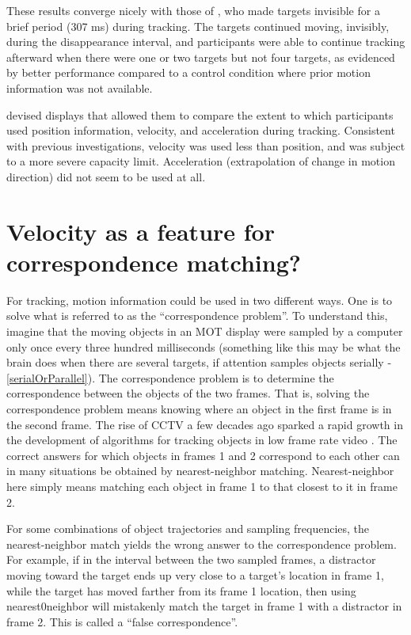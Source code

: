 \documentclass[
]{book}
\begin{document}
These results converge nicely with those of \citet{fencsikRoleLocationMotion2007}, who made targets invisible for a brief period (307 ms) during tracking. The targets continued moving, invisibly, during the disappearance interval, and participants were able to continue tracking afterward when there were one or two targets but not four targets, as evidenced by better performance compared to a control condition where prior motion information was not available.

\citet{wangRoleKinematicProperties2021} devised displays that allowed them to compare the extent to which participants used position information, velocity, and acceleration during tracking. Consistent with previous investigations, velocity was used less than position, and was subject to a more severe capacity limit. Acceleration (extrapolation of change in motion direction) did not seem to be used at all.

\hypertarget{velocity-as-a-feature-for-correspondence-matching}{%
\section{Velocity as a feature for correspondence matching?}\label{velocity-as-a-feature-for-correspondence-matching}}

For tracking, motion information could be used in two different ways. One is to solve what is referred to as the ``correspondence problem''. To understand this, imagine that the moving objects in an MOT display were sampled by a computer only once every three hundred milliseconds (something like this may be what the brain does when there are several targets, if attention samples objects serially - \ref{serialOrParallel}). The correspondence problem is to determine the correspondence between the objects of the two frames. That is, solving the correspondence problem means knowing where an object in the first frame is in the second frame. The rise of CCTV a few decades ago sparked a rapid growth in the development of algorithms for tracking objects in low frame rate video \citep{kamkarMultipletargetTrackingHuman2020}. The correct answers for which objects in frames 1 and 2 correspond to each other can in many situations be obtained by nearest-neighbor matching. Nearest-neighbor here simply means matching each object in frame 1 to that closest to it in frame 2.

For some combinations of object trajectories and sampling frequencies, the nearest-neighbor match yields the wrong answer to the correspondence problem. For example, if in the interval between the two sampled frames, a distractor moving toward the target ends up very close to a target's location in frame 1, while the target has moved farther from its frame 1 location, then using nearest0neighbor will mistakenly match the target in frame 1 with a distractor in frame 2. This is called a ``false correspondence''.
\end{document}
